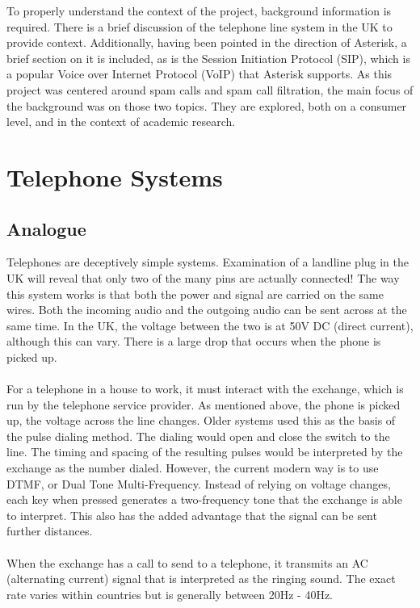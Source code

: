 \documentclass[main.tex]{subfiles}
\begin{document}
To properly understand the context of the project, background information is required. There is a brief discussion of the telephone line system in the UK to provide context. Additionally, having been pointed in the direction of Asterisk, a brief section on it is included, as is the Session Initiation Protocol (SIP), which is a popular Voice over Internet Protocol (VoIP) that Asterisk supports. As this project was centered around spam calls and  spam call filtration, the main focus of the background was on those two topics. They are explored, both on a consumer level, and in the context of academic research.

\section{Telephone Systems}
\subsection{Analogue}
Telephones are deceptively simple systems. Examination of a landline plug in the UK will reveal that only two of the many pins are actually connected! The way this system works is that both the power and signal are carried on the same wires. Both the incoming audio and the outgoing audio can be sent across at the same time. In the UK, the voltage between the two is at 50V DC (direct current), although this can vary. There is a large drop that occurs when the phone is picked up. \cite{telephone}
\\\\
For a telephone in a house to work, it must interact with the exchange, which is run by the telephone service provider. As mentioned above, the phone is picked up, the voltage across the line changes. Older systems used this as the basis of the pulse dialing method. The dialing would open and close the switch to the line. The timing and spacing of the resulting pulses would be interpreted by the exchange as the number dialed. However, the current modern way is to use DTMF, or Dual Tone Multi-Frequency. Instead of relying on voltage changes, each key when pressed generates a two-frequency tone that the exchange is able to interpret. This also has the added advantage that the signal can be sent further distances. \cite{telephone}
\\\\
When the exchange has a call to send to a telephone, it transmits an AC (alternating current) signal that is interpreted as the ringing sound. The exact rate varies within countries but is generally between 20Hz - 40Hz. \cite{telephone}
\end{document}
